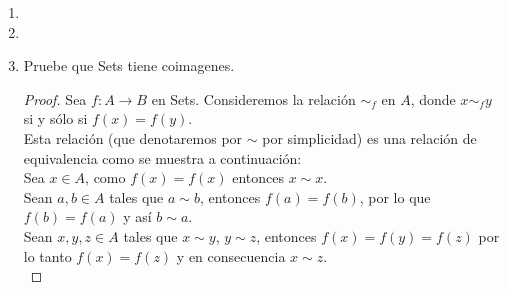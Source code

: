 \documentclass{article}
\begin{document}
\begin{enumerate}[label=\textbf{Ej \arabic*.}]
\begin{proof}
Así como $\alpha\mu_i=\beta\mu_i\,\,\forall i\in I$, entonces para cada $i\in I$ $\exists ! \mu_i':A_i\to K$ tal que $\eta\mu_i'=\mu_i$, es decir, se tiene que 
para cada $i\in I$ el siguiente diagrama conmuta:

\centerline{
}
es decir, $\eta f_i=\mu_i$.Con esto en mente, tenemos el siguiente diagrama para cada $i\in I$:\\


Entonces por la propiedad $(U_2)$ de la unión, existe $f:\displaystyle\bigcup_{i\in I}A_i\longrightarrow K$ tal que $\eta f=\mu$. Así 
\[\alpha\mu=\alpha\eta f=\beta \eta f=\beta\mu.\]


\end{proof}




\item 

\item

\item Pruebe que Sets tiene coimagenes.

\begin{proof}
Sea $f:A\to B$ en Sets. Consideremos la relación $\sim_f$ en $A$, donde $x\sim_f y$ si y sólo si $f(x)=f(y)$.\\

Esta relación (que denotaremos por $\sim$ por simplicidad) es una relación de equivalencia como se muestra a continuación:\\

\quad Sea $x\in A$, como $f(x)=f(x)$ entonces $x\sim x$.\\

\quad Sean $a,b\in A$ tales que $a\sim b$, entonces $f(a)=f(b)$, por lo que $f(b)=f(a)$ y así $b\sim a$.\\

\quad Sean $x,y,z\in A$ tales que $x\sim y$, $y\sim z$, entonces $f(x)=f(y)=f(z)$ por lo tanto $f(x)=f(z)$ y en consecuencia
$x\sim z$.\\


\end{proof}
\end{enumerate}
\end{document}

